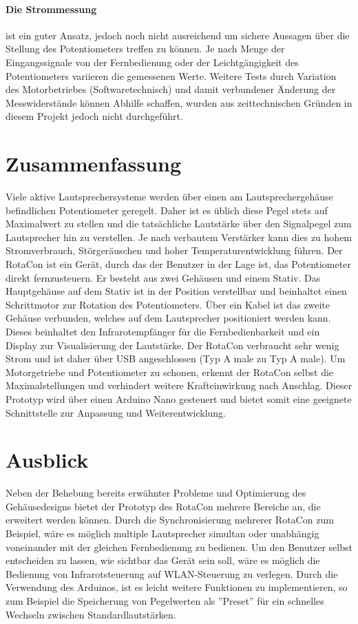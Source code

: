 \documentclass[11pt, titlepage]{report}
\begin{document}
			\paragraph{Die Strommessung}
			ist ein guter Ansatz, jedoch noch nicht ausreichend um sichere Aussagen über die Stellung des Potentiometers treffen zu können. Je nach Menge der Eingangssignale von der Fernbedienung oder der Leichtgängigkeit des Potentiometers variieren die gemessenen Werte. Weitere Tests durch Variation des Motorbetriebes (Softwaretechnisch) und damit verbundener Änderung der Messwiderstände können Abhilfe schaffen, wurden aus zeittechnischen Gründen in diesem Projekt jedoch nicht durchgeführt.

		\section{Zusammenfassung}
			Viele aktive Lautsprechersysteme werden über einen am Lautsprechergehäuse befindlichen Potentiometer geregelt. Daher ist es üblich diese Pegel stets auf Maximalwert zu stellen und die tatsächliche Lautstärke über den Signalpegel zum Lautsprecher hin zu verstellen. Je nach verbautem Verstärker kann dies zu hohem Stromverbrauch, Störgeräuschen und hoher Temperaturentwicklung führen. Der RotaCon ist ein Gerät, durch das der Benutzer in der Lage ist, das Potentiometer direkt fernzusteuern. Er besteht aus zwei Gehäusen und einem Stativ. Das Hauptgehäuse auf dem Stativ ist in der Position verstellbar und beinhaltet einen Schrittmotor zur Rotation des Potentiometers. Über ein Kabel ist das zweite Gehäuse verbunden, welches auf dem Lautsprecher positioniert werden kann. Dieses beinhaltet den Infrarotempfänger für die Fernbedienbarkeit und ein Display zur Visualisierung der Lautstärke. Der RotaCon verbraucht sehr wenig Strom und ist daher über USB angeschlossen (Typ A male zu Typ A male). Um Motorgetriebe und Potentiometer zu schonen, erkennt der RotaCon selbst die Maximalstellungen und verhindert weitere Krafteinwirkung nach Anschlag. Dieser Prototyp wird über einen Arduino Nano gesteuert und bietet somit eine geeignete Schnittstelle zur Anpassung und Weiterentwicklung.
		\section{Ausblick}
			Neben der Behebung bereits erwähnter Probleme und Optimierung des Gehäusedesigns bietet der Prototyp des RotaCon mehrere Bereiche an, die erweitert werden können. Durch die Synchronisierung mehrerer RotaCon zum Beispiel, wäre es möglich multiple Lautsprecher simultan oder unabhängig voneinander mit der gleichen Fernbedienung zu bedienen. Um den Benutzer selbst entscheiden zu lassen, wie sichtbar das Gerät sein soll, wäre es möglich die Bedienung von Infrarotsteuerung auf WLAN-Steuerung zu verlegen. Durch die Verwendung des Arduinos, ist es leicht weitere Funktionen zu implementieren, so zum Beispiel die Speicherung von Pegelwerten als ''Preset'' für ein schnelles Wechseln zwischen Standardlautstärken.
\end{document}

